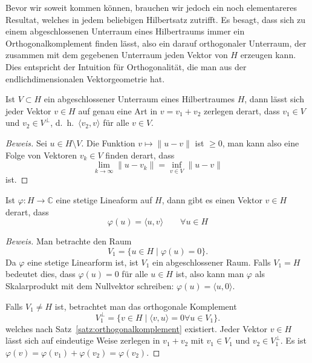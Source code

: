Bevor wir soweit kommen können, brauchen wir jedoch ein noch elementareres
Resultat, welches in jedem beliebigen Hilbertsatz zutrifft.
Es besagt, dass sich zu einem abgeschlossenen Unterraum eines Hilbertraums 
immer ein Orthogonalkomplement finden lässt, also ein darauf orthogonaler
Unterraum, der zusammen mit dem gegebenen Unterraum jeden Vektor von $H$
erzeugen kann.
Dies entspricht der Intuition für Orthogonalität, die man aus der
endlichdimensionalen Vektorgeometrie hat.

\begin{satz}
\label{satz:orthogonalkomplement}
Ist $V\subset H$ ein abgeschlossener Unterraum eines Hilbertraumes $H$,
dann lässt sich jeder Vektor $v\in H$ auf genau eine Art in $v = v_1+v_2$
zerlegen derart, dass $v_1 \in V$ und $v_2\in V^{\perp}$,
d.~h.~$\langle v_2,v\rangle$ für alle $v\in V$. %
\end{satz}

\begin{proof}[Beweis]
Sei $u\in H\setminus V$.
Die Funktion $v\mapsto \| u-v\|$ ist $\ge 0$, man kann also eine
Folge von Vektoren $v_k\in V$ finden derart, dass
\[
\lim_{k\to\infty} \|u-v_k\| = \inf_{v\in V} \|u-v\|
\]
ist.
\end{proof}

\begin{satz}[Riesz]
Ist $\varphi\colon H\to \mathbb C$ eine stetige Lineaform auf $H$, dann 
gibt es einen Vektor $v\in H$ derart, dass
\[
\varphi(u) = \langle u,v\rangle
\qquad
\forall u\in H
\]
\end{satz}

\begin{proof}[Beweis]
Man betrachte den Raum
\[
V_1 = \{ u \in H \;|\;\varphi(u)=0\}.
\]
Da $\varphi$ eine stetige Linearform ist, ist $V_1$ ein abgeschlossener Raum.
Falls $V_1=H$ bedeutet dies, dass $\varphi(u)=0$ für alle $u\in H$ ist,
also kann man $\varphi$ als Skalarprodukt mit dem Nullvektor schreiben:
$\varphi(u) = \langle u,0\rangle$.

Falls $V_1 \ne H$ ist, betrachtet man das orthogonale Komplement
\[
V_1^{\perp} = \{ v\in H\;|\; \langle v,u\rangle = 0 \forall u\in V_1\}.
\]
welches nach Satz~\ref{satz:orthogonalkomplement} existiert.
Jeder Vektor $v\in H$ lässt sich auf eindeutige Weise zerlegen in
$v_1+v_2$ mit $v_1\in V_1$ und $v_2\in V_1^{\perp}$.
Es ist $\varphi(v)=\varphi(v_1)+\varphi(v_2)=\varphi(v_2)$.

\end{proof}



